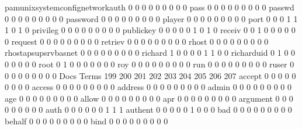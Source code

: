 \documentclass[compress,8pt]{beamer}
\begin{document}
\begin{frame}
\begin{Schunk}
  pamunixsystemconfignetworkauth             0   0   0   0   0   0   0   0   0
  pass                                       0   0   0   0   0   0   0   0   0
  passwd                                     0   0   0   0   0   0   0   0   0
  password                                   0   0   0   0   0   0   0   0   0
  player                                     0   0   0   0   0   0   0   0   0
  port                                       0   0   0   1   1   1   0   1   0
  privileg                                   0   0   0   0   0   0   0   0   0
  publickey                                  0   0   0   0   0   1   0   1   0
  receiv                                     0   0   1   0   0   0   0   0   0
  request                                    0   0   0   0   0   0   0   0   0
  retriev                                    0   0   0   0   0   0   0   0   0
  rhost                                      0   0   0   0   0   0   0   0   0
  rhostapsupsrvbasnet                        0   0   0   0   0   0   0   0   0
  richard                                    1   0   0   0   0   1   1   0   0
  richarduid                                 0   1   0   0   0   0   0   0   0
  root                                       0   1   0   0   0   0   0   0   0
  roy                                        0   0   0   0   0   0   0   0   0
  run                                        0   0   0   0   0   0   0   0   0
  ruser                                      0   0   0   0   0   0   0   0   0
                                          Docs
Terms                                      199 200 201 202 203 204 205 206 207
  accept                                     0   0   0   0   0   0   0   0   0
  access                                     0   0   0   0   0   0   0   0   0
  address                                    0   0   0   0   0   0   0   0   0
  admin                                      0   0   0   0   0   0   0   0   0
  age                                        0   0   0   0   0   0   0   0   0
  allow                                      0   0   0   0   0   0   0   0   0
  apr                                        0   0   0   0   0   0   0   0   0
  argument                                   0   0   0   0   0   0   0   0   0
  auth                                       0   0   0   0   0   0   1   1   1
  authent                                    0   0   0   0   0   1   0   0   0
  bad                                        0   0   0   0   0   0   0   0   0
  behalf                                     0   0   0   0   0   0   0   0   0
  bind                                       0   0   0   0   0   0   0   0   0

\end{Schunk}
\end{frame}
\end{document}
